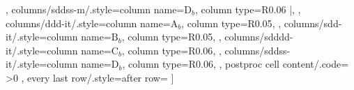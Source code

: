 \documentclass[convert={outext=.png},border=10pt]{standalone}
\newcommand{\colwdtha}{0.06\linewidth}
\newcommand{\colwdthb}{0.05\linewidth}
\begin{document}
{{                      },
                      columns/sddss-m/.style={column name=$\mathrm{D}_b$,
                      column type={R{\colwdtha} |},
                      },
                      columns/ddd-it/.style={column name=$\mathrm{A}_b$, column
                      type={R{\colwdthb}},
                      },
                      columns/sdd-it/.style={column name=$\mathrm{B}_b$, column
                      type={R{\colwdthb}},
                      },
                      columns/sdddd-it/.style={column name=$\mathrm{C}_b$,
                      column type={R{\colwdtha}},
                      },
                      columns/sddss-it/.style={column name=$\mathrm{D}_b$,
                      column type={R{\colwdtha}},
                      },
                      postproc cell content/.code={
                        \ifodd\pgfplotstablerow\relax
                        \else
                            \ifnum\pgfplotstablecol>0
                            \fi
                        \fi
                      },
                      every last row/.style={after row=\bottomrule}
                      ]{\data}
}
\end{document}

